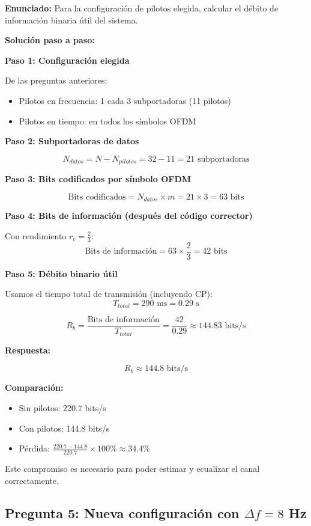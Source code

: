 \documentclass[11pt,a4paper]{article}
\begin{document}
\textbf{Enunciado:} Para la configuración de pilotos elegida, calcular el débito de información binaria útil del sistema.

\vspace{0.3cm}
\textbf{Solución paso a paso:}

\textbf{Paso 1: Configuración elegida}

De las preguntas anteriores:
\begin{itemize}
    \item Pilotos en frecuencia: 1 cada 3 subportadoras (11 pilotos)
    \item Pilotos en tiempo: en todos los símbolos OFDM
\end{itemize}

\textbf{Paso 2: Subportadoras de datos}

\[
N_{datos} = N - N_{pilotos} = 32 - 11 = 21 \text{ subportadoras}
\]

\textbf{Paso 3: Bits codificados por símbolo OFDM}

\[
\text{Bits codificados} = N_{datos} \times m = 21 \times 3 = 63 \text{ bits}
\]

\textbf{Paso 4: Bits de información (después del código corrector)}

Con rendimiento $r_c = \frac{2}{3}$:
\[
\text{Bits de información} = 63 \times \frac{2}{3} = 42 \text{ bits}
\]

\textbf{Paso 5: Débito binario útil}

Usamos el tiempo total de transmisión (incluyendo CP):
\[
T_{total} = 290 \text{ ms} = 0.29 \text{ s}
\]

\[
R_b = \frac{\text{Bits de información}}{T_{total}} = \frac{42}{0.29} \approx 144.83 \text{ bits/s}
\]

\textbf{Respuesta:}

\[
\boxed{R_b \approx 144.8 \text{ bits/s}}
\]

\textbf{Comparación:}
\begin{itemize}
    \item Sin pilotos: 220.7 bits/s
    \item Con pilotos: 144.8 bits/s
    \item Pérdida: $\frac{220.7-144.8}{220.7} \times 100\% \approx 34.4\%$
\end{itemize}

Este compromiso es necesario para poder estimar y ecualizar el canal correctamente.

\subsection*{Pregunta 5: Nueva configuración con $\Delta f = 8$ Hz}
\end{document}
